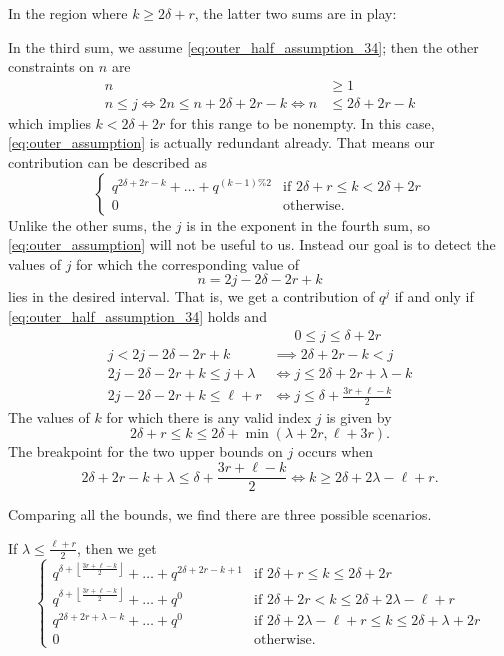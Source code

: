 In the region where $k \ge 2\delta + r$, the latter two sums are in play:
\begin{itemize}
  \ii In the third sum, we assume \eqref{eq:outer_half_assumption_34};
  then the other constraints on $n$ are
  \begin{align*}
    n &\ge 1 \\
    n \le j \iff 2n \le n+2\delta+2r-k \iff n &\le 2\delta + 2r - k
  \end{align*}
  which implies $k < 2 \delta + 2r$ for this range to be nonempty.
  In this case, \eqref{eq:outer_assumption} is actually redundant already.
  That means our contribution can be described as
  \[
    \begin{cases}
      q^{2\delta+2r-k} + \dots + q^{(k-1)\%2} & \text{if } 2\delta+r \le k < 2\delta+2r \\
      0 & \text{otherwise}.
    \end{cases}
  \]
  \ii Unlike the other sums, the $j$ is in the exponent in the fourth sum,
  so \eqref{eq:outer_assumption} will not be useful to us.
  Instead our goal is to detect the values of $j$ for which the corresponding value of
  \[ n = 2j-2\delta-2r+k \]
  lies in the desired interval.
  That is, we get a contribution of $q^j$ if and only if
  \eqref{eq:outer_half_assumption_34} holds and
  \begin{align*}
    &\phantom{\iff} 0 \le j \le \delta + 2r \\
    j < 2j-2\delta-2r+k &\implies 2\delta+2r-k < j \\
    2j-2\delta-2r+k \le j+\lambda &\iff j \le 2\delta+2r+\lambda-k \\
    2j-2\delta-2r+k \le \ell+r &\iff j \le \delta+\frac{3r+\ell-k}{2}
  \end{align*}
  The values of $k$ for which there is any valid index $j$ is given by
  \[ 2\delta + r \le k \le 2 \delta + \min \left( \lambda + 2r, \ell + 3r \right). \]
  The breakpoint for the two upper bounds on $j$ occurs when
  \[ 2\delta+2r-k+\lambda \le \delta+\frac{3r+\ell-k}{2}
    \iff k \ge 2\delta + 2\lambda - \ell + r. \]

  Comparing all the bounds, we find there are three possible scenarios.
  \begin{itemize}
    \ii If $\lambda \le \frac{\ell+r}{2}$, then we get
    \[
      \begin{cases}
        q^{\delta+\left\lfloor\frac{3r+\ell-k}{2}\right\rfloor} + \dots + q^{2\delta+2r-k+1}
          & \text{if } 2\delta+r \le k \le 2\delta+2r  \\
        q^{\delta+\left\lfloor\frac{3r+\ell-k}{2}\right\rfloor} + \dots + q^{0}
          & \text{if } 2\delta+2r < k \le 2\delta+2\lambda-\ell+r  \\
        q^{2\delta+2r+\lambda-k} + \dots + q^0
          & \text{if } 2\delta+2\lambda-\ell+r \le k \le 2\delta+\lambda+2r \\
        0 & \text{otherwise}.
      \end{cases}
    \]


\end{itemize}
\end{itemize}

